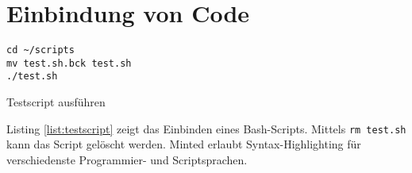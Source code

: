\section{Einbindung von Code}

\begin{longlisting}
\begin{verbatim}
cd ~/scripts
mv test.sh.bck test.sh
./test.sh
\end{verbatim}
\caption{Testscript ausführen}
\label{list:testscript}
\end{longlisting}
\FloatBarrier

Listing \ref{list:testscript} zeigt das Einbinden eines Bash-Scripts. Mittels \texttt{rm test.sh} kann das Script gelöscht werden. Minted erlaubt Syntax-Highlighting für verschiedenste Programmier- und Scriptsprachen.